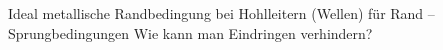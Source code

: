 \begin{question}[section=5,subsection=53,name={Randbedingungen in Hohlleiter},difficulty=,type=mdl,tags={}]
	Ideal metallische Randbedingung bei Hohlleitern (Wellen) für Rand –Sprungbedingungen
	Wie kann man Eindringen verhindern?
\end{question}
\begin{solution}
	
\end{solution}